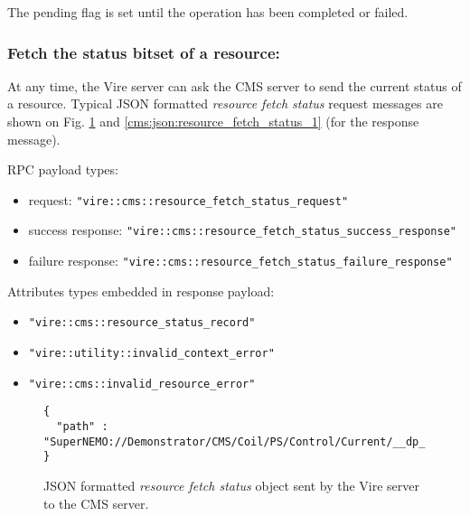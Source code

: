 

The pending flag is set until the  operation has been completed or failed.

\clearpage
\pagebreak

\subsubsection{Fetch the status bitset of a resource:}

At  any time,  the Vire  server can  ask the  CMS server  to send  the
current status  of a resource.  Typical  JSON formatted \emph{resource
  fetch    status}    request    messages   are    shown    on    Fig.
\ref{cms:json:resource_fetch_status_0}                             and
\ref{cms:json:resource_fetch_status_1} (for the response message).

RPC payload types:
\begin{itemize}
\item request: \texttt{"vire::cms::resource\_fetch\_status\_request"}
\item success response: \texttt{"vire::cms::resource\_fetch\_status\_success\_response"}
\item failure response: \texttt{"vire::cms::resource\_fetch\_status\_failure\_response"}
\end{itemize}

Attributes types embedded in response payload:
\begin{itemize}
\item \texttt{"vire::cms::resource\_status\_record"}
\item \texttt{"vire::utility::invalid\_context\_error"}
\item \texttt{"vire::cms::invalid\_resource\_error"}
\end{itemize}



  \begin{figure}[h]
  \footnotesize
  \begin{Verbatim}[frame=single,xleftmargin=0.cm,label=\fbox{\texttt{JSON}}]
{
  "path" : "SuperNEMO://Demonstrator/CMS/Coil/PS/Control/Current/__dp_read__"
}
\end{Verbatim}
  \normalsize
  \caption{JSON formatted  \emph{resource  fetch status}  object
    sent by  the Vire server to  the CMS server.}\label{cms:json:resource_fetch_status_0}
  \end{figure}

